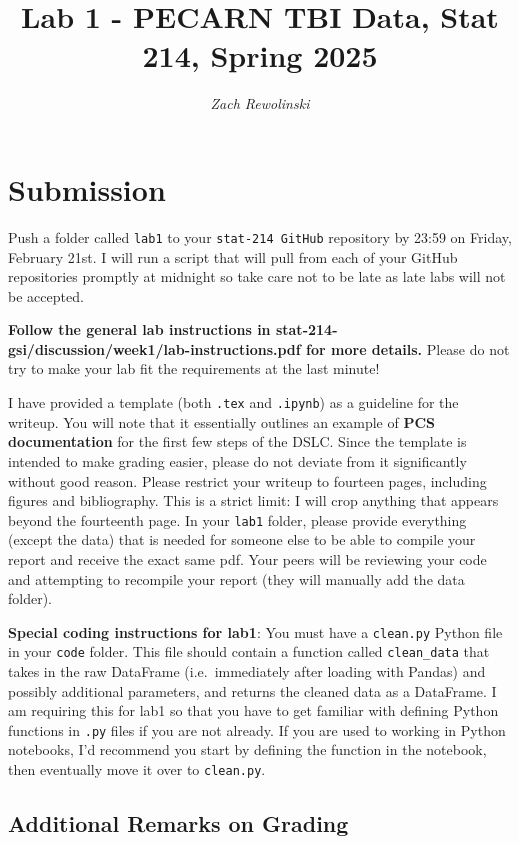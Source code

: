 \documentclass[10pt,letterpaper]{article}
\title{Lab 1 - PECARN TBI Data, Stat 214, Spring 2025}
\author{\textit{Zach Rewolinski}}
\begin{document}
\maketitle

\section*{Submission}
Push a folder called \texttt{lab1} to your \texttt{stat-214 GitHub} repository by 23:59 on Friday, February 21st. I will run a script that will pull from each of your GitHub repositories promptly at midnight so take care not to be late as late labs will not be accepted.

\textbf{Follow the general lab instructions in stat-214-gsi/discussion/week1/lab-instructions.pdf for more details.} Please do not try to make your lab fit the requirements at the last minute!

I have provided a template (both \texttt{.tex} and \texttt{.ipynb}) as a guideline for the writeup. You will note that it essentially outlines an example of \textbf{PCS documentation} for the first few steps of the DSLC. Since the template is intended to make grading easier, please do not deviate from it significantly without good reason. Please restrict your writeup to fourteen pages, including figures and bibliography. This is a strict limit: I will crop anything that appears beyond the fourteenth page. In your \texttt{lab1} folder, please provide everything (except the data) that is needed for someone else to be able to compile your report and receive the exact same pdf. Your peers will be reviewing your code and attempting to recompile your report (they will manually add the data folder).

\textbf{Special coding instructions for lab1}: You must have a \texttt{clean.py} Python file in your \texttt{code} folder. This file should contain a function called \texttt{clean\_data} that takes in the raw DataFrame (i.e.~immediately after loading with Pandas) and possibly additional parameters, and returns the cleaned data as a DataFrame. I am requiring this for lab1 so that you have to get familiar with defining Python functions in \texttt{.py} files if you are not already. If you are used to working in Python notebooks, I'd recommend you start by defining the function in the notebook, then eventually move it over to \texttt{clean.py}.

\subsection*{Additional Remarks on Grading}
\end{document}
